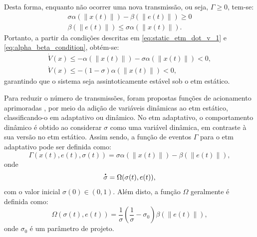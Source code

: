 Desta forma, enquanto não ocorrer uma nova transmissão, ou seja, $\Gamma \geq 0$, tem-se: \begin{gather}
  \sigma \alpha(\|x(t)\|)- \beta(\|e(t)\|) \geq 0 \\[8pt]
  \beta(\|e(t)\|) \leq \sigma \alpha(\|x(t)\|). \label{eq:alpha_beta_condition}
\end{gather} Portanto, a partir da condições descritas em \eqref{eq:static_etm_dot_v_1} e \eqref{eq:alpha_beta_condition}, obtém-se: \begin{gather}
  \dot{V}(x) \leq - \alpha(\|x(t)\|) - \sigma \alpha(\|x(t)\|) < 0, \\[8pt]
  \dot{V}(x) \leq - (1 - \sigma)\alpha(\|x(t)\|) < 0, \label{eq:static_etm_dot_v_2}
\end{gather} garantindo que o sistema seja assintoticamente estável sob o \acrshort{etm} estático.

Para reduzir o número de transmissões, foram propostas funções de acionamento aprimoradas \citep{Wang2020,Zong2023,Ge2017, Ning2018, Wu2021}, por meio da adição de variáveis dinâmicas ao \acrshort{etm} estático, classificando-o em adaptativo ou dinâmico. No \acrshort{etm} adaptativo, o comportamento dinâmico é obtido ao considerar $\sigma$ como uma variável dinâmica, em contraste à sua versão no \acrshort{etm} estático. Assim sendo, a função de eventos $\Gamma$ para o \acrshort{etm} adaptativo pode ser definida como: \begin{equation}
  \Gamma(x(t), e(t), \sigma(t)) = \sigma \alpha(\|x(t)\|)- \beta(\|e(t)\|),
  \label{eq:adaptative_gamma_function_2}
\end{equation} onde \begin{equation}
  \dt{\sigma} = \Omega(\sigma(t), e(t)),
\end{equation} com o valor inicial $\sigma(0) \in (0, 1)$. Além disto, a função $\Omega$ geralmente é definida como: \begin{equation}
  \Omega(\sigma(t), e(t)) = \frac{1}{\sigma}\left(\frac{1}{\sigma} - \sigma_0\right)\beta(\|e(t)\|), \label{eq:omega_function}
\end{equation} onde $\sigma_0$ é um parâmetro de projeto.

